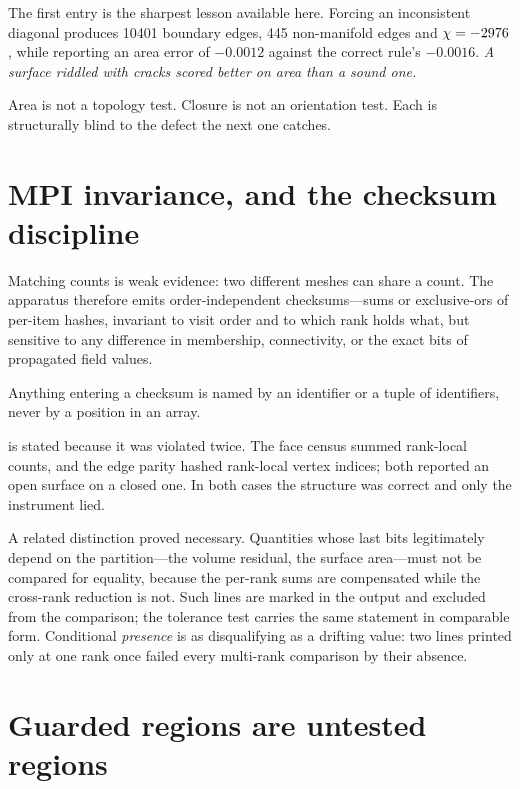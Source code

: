 The first entry is the sharpest lesson available here. Forcing an inconsistent
diagonal produces 10401 boundary edges, 445 non-manifold edges and
$\chi = -2976$, while reporting an area error of $-0.0012$ against the
correct rule's $-0.0016$. \emph{A surface riddled with cracks scored better on
area than a sound one.}

\begin{designrule}\label{rule:notatest}
Area is not a topology test. Closure is not an orientation test. Each is
structurally blind to the defect the next one catches.
\end{designrule}

\section{MPI invariance, and the checksum discipline}
\label{sec:mpi}

Matching counts is weak evidence: two different meshes can share a count. The
apparatus therefore emits order-independent checksums---sums or exclusive-ors of
per-item hashes, invariant to visit order and to which rank holds what, but
sensitive to any difference in membership, connectivity, or the exact bits of
propagated field values.

\begin{designrule}\label{rule:gidkey}
Anything entering a checksum is named by an identifier or a tuple of
identifiers, never by a position in an array.
\end{designrule}

 is stated because it was violated twice. The face census
summed rank-local counts, and the edge parity hashed rank-local vertex indices;
both reported an open surface on a closed one. In both cases the structure was
correct and only the instrument lied.

A related distinction proved necessary. Quantities whose last bits legitimately
depend on the partition---the volume residual, the surface area---must not be
compared for equality, because the per-rank sums are compensated while the
cross-rank reduction is not. Such lines are marked in the output and excluded
from the comparison; the tolerance test carries the same statement in comparable
form. Conditional \emph{presence} is as disqualifying as a drifting value: two
lines printed only at one rank once failed every multi-rank comparison by their
absence.

\section{Guarded regions are untested regions}
\label{sec:guarded}

